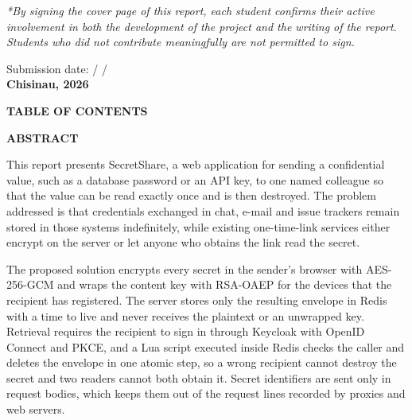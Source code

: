 \documentclass[12pt,a4paper]{article}
\makeatletter
\numberwithin{equation}{section}
\numberwithin{figure}{section}
\numberwithin{table}{section}
\newcommand{\plainheading}[1]{%
  \clearpage
  \begin{center}
    {\fontsize{13pt}{16pt}\bfseries\MakeUppercase{#1}\par}
  \end{center}
  \vspace{14pt}
}
\renewcommand{\tableofcontents}{{\setstretch{1.15}\@starttoc{toc}}}
\makeatother
\begin{document}
\begin{titlepage}
\begin{center}
\begin{flushleft}
\vspace{0.5cm}
{\fontsize{10pt}{12pt}\selectfont\itshape
*By signing the cover page of this report, each student confirms their active involvement in both the development of the project and the writing of the report. Students who did not contribute meaningfully are not permitted to sign.\par}
\end{flushleft}

\vfill

\vspace{0.3cm}
{\fontsize{11pt}{13pt}\selectfont Submission date: \underline{\hspace{1.5cm}} / \underline{\hspace{1.5cm}} / \underline{\hspace{2.0cm}}}\\[0.2cm]
{\fontsize{12pt}{14pt}\selectfont\bfseries Chisinau, 2026}
\end{center}
\end{titlepage}
\setcounter{page}{2}

\pagestyle{empty}

\plainheading{Table of Contents}
\tableofcontents

\plainheading{Abstract}

This report presents SecretShare, a web application for sending a confidential value, such as a database password or an API key, to one named colleague so that the value can be read exactly once and is then destroyed. The problem addressed is that credentials exchanged in chat, e-mail and issue trackers remain stored in those systems indefinitely, while existing one-time-link services either encrypt on the server or let anyone who obtains the link read the secret.

The proposed solution encrypts every secret in the sender's browser with AES-256-GCM and wraps the content key with RSA-OAEP for the devices that the recipient has registered. The server stores only the resulting envelope in Redis with a time to live and never receives the plaintext or an unwrapped key. Retrieval requires the recipient to sign in through Keycloak with OpenID Connect and PKCE, and a Lua script executed inside Redis checks the caller and deletes the envelope in one atomic step, so a wrong recipient cannot destroy the secret and two readers cannot both obtain it. Secret identifiers are sent only in request bodies, which keeps them out of the request lines recorded by proxies and web servers.
\end{document}
